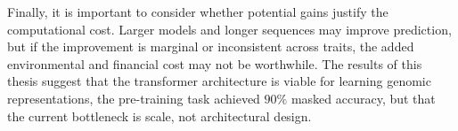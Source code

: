 Finally, it is important to consider whether potential gains justify the
computational cost. Larger models and longer sequences may improve
prediction, but if the improvement is marginal or inconsistent across
traits, the added environmental and financial cost may not be worthwhile.
The results of this thesis suggest that the transformer architecture is
viable for learning genomic representations, the pre-training task
achieved $90\%$ masked accuracy, but that the current bottleneck is
scale, not architectural design.